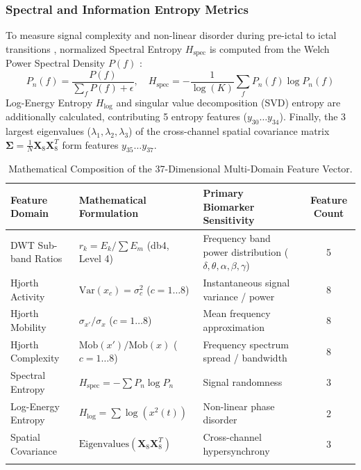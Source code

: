 \documentclass[pdflatex,sn-mathphys-num]{sn-jnl}%
\begin{document}
\subsubsection{Spectral and Information Entropy Metrics}
To measure signal complexity and non-linear disorder during pre-ictal to ictal transitions \cite{chen2026entropy, shannon1948mathematical}, normalized Spectral Entropy $H_{\text{spec}}$ is computed from the Welch Power Spectral Density $P(f)$ \cite{inouye1991potential}:
\begin{equation}
P_n(f) = \frac{P(f)}{\sum_{f} P(f) + \epsilon}, \quad H_{\text{spec}} = -\frac{1}{\log(K)} \sum_{f} P_n(f) \log P_n(f)
\end{equation}
Log-Energy Entropy $H_{\text{log}}$ and singular value decomposition (SVD) entropy are additionally calculated, contributing 5 entropy features ($y_{30} \dots y_{34}$). Finally, the 3 largest eigenvalues ($\lambda_1, \lambda_2, \lambda_3$) of the cross-channel spatial covariance matrix $\mathbf{\Sigma} = \frac{1}{N}\mathbf{X}_8 \mathbf{X}_8^T$ form features $y_{35} \dots y_{37}$.

\begin{table}[h]
\caption{Mathematical Composition of the 37-Dimensional Multi-Domain Feature Vector.}\label{tab2}
\begin{tabular}{@{}lllc@{}}
\toprule
Feature Domain & Mathematical Formulation & Primary Biomarker Sensitivity & Feature Count \\
\midrule
DWT Sub-band Ratios & $r_k = E_k / \sum E_m$ (db4, Level 4) & Frequency band power distribution ($\delta,\theta,\alpha,\beta,\gamma$) & 5 \\
Hjorth Activity & $\text{Var}(x_c) = \sigma_c^2$ ($c=1\dots 8$) & Instantaneous signal variance / power & 8 \\
Hjorth Mobility & $\sigma_{x'} / \sigma_x$ ($c=1\dots 8$) & Mean frequency approximation & 8 \\
Hjorth Complexity & $\text{Mob}(x') / \text{Mob}(x)$ ($c=1\dots 8$) & Frequency spectrum spread / bandwidth & 8 \\
Spectral Entropy & $H_{\text{spec}} = -\sum P_n \log P_n$ & Signal randomness & 3 \\
Log-Energy Entropy & $H_{\text{log}} = \sum \log(x^2(t))$ & Non-linear phase disorder & 2 \\
Spatial Covariance & $\text{Eigenvalues}(\mathbf{X}_8 \mathbf{X}_8^T)$ & Cross-channel hypersynchrony & 3 \\
\botrule
\end{tabular}
\end{table}
\end{document}
